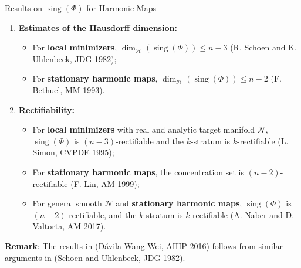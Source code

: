 \documentclass[11pt]{beamer}
\newcommand{\cN}{\mathcal{N}}
\newcommand{\HH}{\mathcal{H}}
\DeclareMathOperator{\sing}{sing}
\theoremstyle{plain}
\theoremstyle{definition}
\begin{document}
\begin{frame}{Results on $ \sing(\Phi) $ for Harmonic Maps}

\begin{enumerate}
\item \textbf{Estimates of the Hausdorff dimension:}
\begin{itemize}
\item For \textbf{local minimizers}, $ \dim_{\HH}(\sing(\Phi))\leq n-3 $ (R. Schoen and K. Uhlenbeck, JDG 1982);
\item For \textbf{stationary harmonic maps}, $ \dim_{\HH}(\sing(\Phi))\leq n-2 $ (F. Bethuel, MM 1993).
\end{itemize}\pause
\item \textbf{Rectifiability:}
\begin{itemize}
\item For \textbf{local minimizers} with real and analytic target manifold $ \cN $, $ \sing(\Phi) $ is $ (n-3) $-rectifiable and the $ k $-stratum is $ k $-rectifiable (L. Simon, CVPDE 1995);
\item For \textbf{stationary harmonic maps}, the concentration set is $ (n-2) $-rectifiable (F. Lin, AM 1999);
\item For general smooth $ \cN $ and \textbf{stationary harmonic maps}, $ \sing(\Phi) $ is $ (n-2) $-rectifiable, and the $ k $-stratum is $ k $-rectifiable (A. Naber and D. Valtorta, AM 2017).
\end{itemize}
\end{enumerate}

\pause

\textbf{Remark}: The results in (D\'{a}vila-Wang-Wei, AIHP 2016) follows from similar arguments in (Schoen and Uhlenbeck, JDG 1982).

\end{frame}
\end{document}
